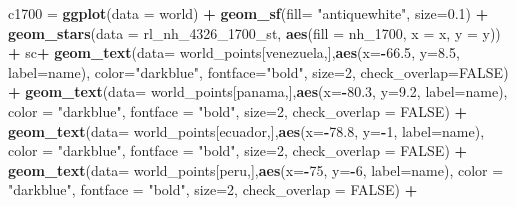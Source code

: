 \documentclass[12pt,twoside]{reedthesis}
\newenvironment{Shaded}{\begin{snugshade}}{\end{snugshade}}
\newcommand{\DataTypeTok}[1]{\textcolor[rgb]{0.13,0.29,0.53}{#1}}
\newcommand{\DecValTok}[1]{\textcolor[rgb]{0.00,0.00,0.81}{#1}}
\newcommand{\FloatTok}[1]{\textcolor[rgb]{0.00,0.00,0.81}{#1}}
\newcommand{\KeywordTok}[1]{\textcolor[rgb]{0.13,0.29,0.53}{\textbf{#1}}}
\newcommand{\NormalTok}[1]{#1}
\newcommand{\OperatorTok}[1]{\textcolor[rgb]{0.81,0.36,0.00}{\textbf{#1}}}
\newcommand{\OtherTok}[1]{\textcolor[rgb]{0.56,0.35,0.01}{#1}}
\newcommand{\StringTok}[1]{\textcolor[rgb]{0.31,0.60,0.02}{#1}}
\begin{document}
\begin{Shaded}
\begin{Highlighting}[]
\NormalTok{c1700 =}\StringTok{ }\KeywordTok{ggplot}\NormalTok{(}\DataTypeTok{data =}\NormalTok{ world) }\OperatorTok{+}\StringTok{ }
\StringTok{  }\KeywordTok{geom_sf}\NormalTok{(}\DataTypeTok{fill=} \StringTok{"antiquewhite"}\NormalTok{, }\DataTypeTok{size=}\FloatTok{0.1}\NormalTok{) }\OperatorTok{+}\StringTok{ }
\StringTok{  }\KeywordTok{geom_stars}\NormalTok{(}\DataTypeTok{data =}\NormalTok{ rl_nh_}\DecValTok{4326}\NormalTok{_}\DecValTok{1700}\NormalTok{_st, }\KeywordTok{aes}\NormalTok{(}\DataTypeTok{fill =}\NormalTok{ nh_}\DecValTok{1700}\NormalTok{, }\DataTypeTok{x =}\NormalTok{ x, }\DataTypeTok{y =}\NormalTok{ y)) }\OperatorTok{+}\StringTok{ }
\StringTok{  }\NormalTok{sc}\OperatorTok{+}
\StringTok{  }\KeywordTok{geom_text}\NormalTok{(}\DataTypeTok{data=}\NormalTok{ world_points[venezuela,],}\KeywordTok{aes}\NormalTok{(}\DataTypeTok{x=}\OperatorTok{-}\FloatTok{66.5}\NormalTok{, }\DataTypeTok{y=}\FloatTok{8.5}\NormalTok{, }\DataTypeTok{label=}\NormalTok{name), }\DataTypeTok{color=}\StringTok{"darkblue"}\NormalTok{, }\DataTypeTok{fontface=}\StringTok{"bold"}\NormalTok{, }\DataTypeTok{size=}\DecValTok{2}\NormalTok{, }\DataTypeTok{check_overlap=}\OtherTok{FALSE}\NormalTok{) }\OperatorTok{+}
\StringTok{  }\KeywordTok{geom_text}\NormalTok{(}\DataTypeTok{data=}\NormalTok{ world_points[panama,],}\KeywordTok{aes}\NormalTok{(}\DataTypeTok{x=}\OperatorTok{-}\FloatTok{80.3}\NormalTok{, }\DataTypeTok{y=}\FloatTok{9.2}\NormalTok{, }\DataTypeTok{label=}\NormalTok{name), }\DataTypeTok{color =} \StringTok{"darkblue"}\NormalTok{, }\DataTypeTok{fontface =} \StringTok{"bold"}\NormalTok{, }\DataTypeTok{size=}\DecValTok{2}\NormalTok{, }\DataTypeTok{check_overlap =} \OtherTok{FALSE}\NormalTok{) }\OperatorTok{+}\StringTok{ }
\StringTok{  }\KeywordTok{geom_text}\NormalTok{(}\DataTypeTok{data=}\NormalTok{ world_points[ecuador,],}\KeywordTok{aes}\NormalTok{(}\DataTypeTok{x=}\OperatorTok{-}\FloatTok{78.8}\NormalTok{, }\DataTypeTok{y=}\OperatorTok{-}\DecValTok{1}\NormalTok{, }\DataTypeTok{label=}\NormalTok{name), }\DataTypeTok{color =} \StringTok{"darkblue"}\NormalTok{, }\DataTypeTok{fontface =} \StringTok{"bold"}\NormalTok{, }\DataTypeTok{size=}\DecValTok{2}\NormalTok{, }\DataTypeTok{check_overlap =} \OtherTok{FALSE}\NormalTok{) }\OperatorTok{+}
\StringTok{  }\KeywordTok{geom_text}\NormalTok{(}\DataTypeTok{data=}\NormalTok{ world_points[peru,],}\KeywordTok{aes}\NormalTok{(}\DataTypeTok{x=}\OperatorTok{-}\DecValTok{75}\NormalTok{, }\DataTypeTok{y=}\OperatorTok{-}\DecValTok{6}\NormalTok{, }\DataTypeTok{label=}\NormalTok{name), }\DataTypeTok{color =} \StringTok{"darkblue"}\NormalTok{, }\DataTypeTok{fontface =} \StringTok{"bold"}\NormalTok{, }\DataTypeTok{size=}\DecValTok{2}\NormalTok{, }\DataTypeTok{check_overlap =} \OtherTok{FALSE}\NormalTok{) }\OperatorTok{+}

\end{Highlighting}
\end{Shaded}
\end{document}

